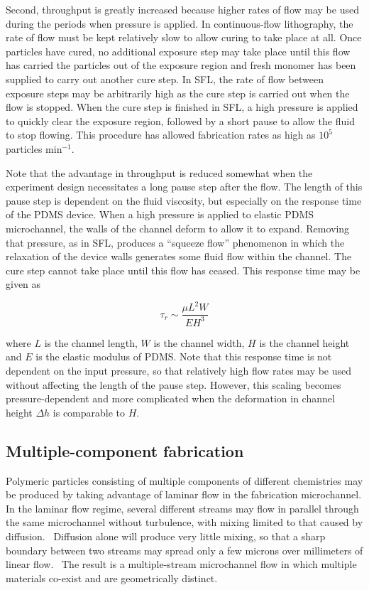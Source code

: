 Second, throughput is greatly increased because higher rates of flow may be used during the periods when pressure is
applied.  In continuous-flow lithography, the rate of flow must be kept relatively slow to allow curing to take place
at all.
Once particles have cured, no 
additional exposure step may take place until this flow has carried the particles out of the
exposure region and fresh monomer has been supplied to carry out another cure step.  In SFL, the rate of flow
between exposure steps
may be arbitrarily high as the cure step is carried out when the flow is stopped. 
When the cure step is finished in SFL, a high pressure is applied to quickly clear the exposure region, followed by a 
short pause to allow the fluid to stop flowing.  This procedure has allowed fabrication rates as high as 
$10^5$ particles min$^{-1}$.~\cite{dendukuri-sfl}

Note that the advantage in throughput is reduced somewhat when the experiment design necessitates a long pause step
after the flow. The length of this pause step is dependent on the fluid viscosity, but especially on the 
response time of the PDMS device.  When a high pressure is applied to elastic PDMS microchannel, the 
walls of the channel deform to allow it to expand.  Removing that pressure, as in SFL, produces a ``squeeze flow''
phenomenon in which the relaxation of the device walls generates some fluid flow within the channel. The cure step 
cannot take place until this flow has ceased.  This response time may be given as

\begin{equation}
\tau_r \sim \frac{\mu L^2 W}{EH^3}
\end{equation}

where $L$ is the channel length, $W$ is the channel width, $H$ is the channel height and $E$ is the elastic
modulus of PDMS.  Note that this response time is not dependent on the input pressure, so that relatively high
flow rates may be used without affecting the length of the pause step. However, this scaling becomes pressure-dependent
and more complicated when the deformation in channel height $\Delta h$ is comparable to $H$.~\cite{dendukuri-sfl}

\subsection{Multiple-component fabrication}

Polymeric particles consisting of multiple components of different chemistries may be produced by taking advantage
of laminar flow in the fabrication microchannel.  
In the laminar flow regime, several different streams may flow in parallel through
the same microchannel without turbulence, with mixing limited to that caused by 
diffusion.~\cite{stone-laminar}  Diffusion alone
will produce very little mixing, so that a sharp boundary between two streams may spread only a few microns over
millimeters of linear flow.~\cite{mohr-flow} The result is a multiple-stream microchannel flow in which multiple materials
co-exist and are geometrically distinct.

